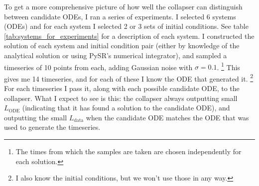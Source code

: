 \documentclass{article}
\begin{document}
To get a more comprehensive picture of how well the collapser can distinguish between candidate ODEs, I ran a series of experiments.
I selected 6 systems (ODEs) and for each system I selected 2 or 3 sets of initial conditions.
See table \ref{tab:systems_for_experiments} for a description of each system.
I constructed the solution of each system and initial condition pair (either by knowledge of the analytical solution or using PySR's numerical integrator), and sampled a timeseries of 10 points from each, adding Gaussian noise with $\sigma = 0.1$.%
\footnote{
The times from which the samples are taken are chosen independently for each solution.
}
This gives me 14 timeseries, and for each of these I know the ODE that generated it.%
\footnote{
I also know the initial conditions, but we won't use those in any way.
}
For each timeseries I pass it, along with each possible candidate ODE, to the collapser.
What I expect to see is this: the collapser always outputting small $L_{\mathrm{ODE}}$ (indicating that it has found a solution to the candidate ODE), and outputting the small $L_{\mathrm{data}}$ when the candidate ODE matches the ODE that was used to generate the timeseries.
\end{document}
